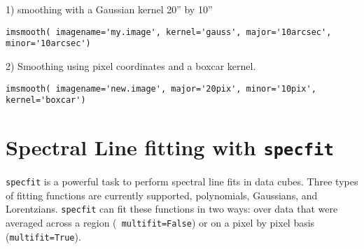 1) smoothing with a Gaussian kernel 20'' by 10''
\begin{verbatim}
imsmooth( imagename='my.image', kernel='gauss', major='10arcsec', minor='10arcsec')
\end{verbatim}


2) Smoothing using pixel coordinates and a boxcar kernel.
\begin{verbatim}
imsmooth( imagename='new.image', major='20pix', minor='10pix', kernel='boxcar')
\end{verbatim}


\section{Spectral Line fitting with {\tt specfit}}
\label{section:analysis.specfit}

{\tt specfit} is a powerful task to perform spectral line fits in data
cubes. Three types of fitting functions are currently supported,
polynomials, Gaussians, and Lorentzians. {\tt specfit} can fit these functions in
two ways: over data that were averaged across a region ({\tt
  multifit=False}) or on a pixel
by pixel basis ({\tt multifit=True}). 


